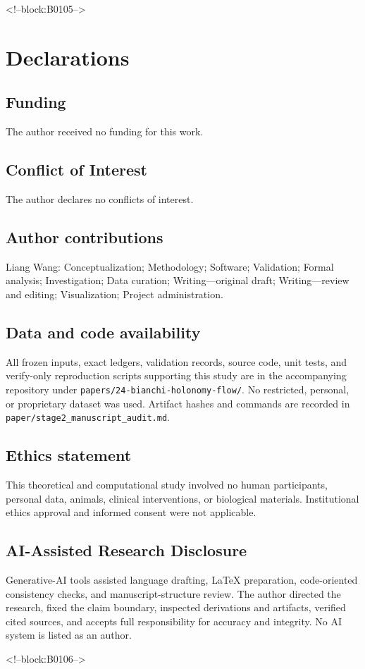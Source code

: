 \documentclass[11pt,a4paper]{article}
\theoremstyle{definition}
\theoremstyle{remark}
\begin{document}
<!--block:B0105-->
\section*{Declarations}
\subsection*{Funding}
The author received no funding for this work.
\subsection*{Conflict of Interest}
The author declares no conflicts of interest.
\subsection*{Author contributions}
Liang Wang: Conceptualization; Methodology; Software; Validation; Formal analysis; Investigation; Data curation; Writing---original draft; Writing---review and editing; Visualization; Project administration.
\subsection*{Data and code availability}
All frozen inputs, exact ledgers, validation records, source code, unit tests, and verify-only reproduction scripts supporting this study are in the accompanying repository under \texttt{papers/24-bianchi-holonomy-flow/}. No restricted, personal, or proprietary dataset was used. Artifact hashes and commands are recorded in \texttt{paper/stage2\_manuscript\_audit.md}.
\subsection*{Ethics statement}
This theoretical and computational study involved no human participants, personal data, animals, clinical interventions, or biological materials. Institutional ethics approval and informed consent were not applicable.
\subsection*{AI-Assisted Research Disclosure}
Generative-AI tools assisted language drafting, LaTeX preparation, code-oriented consistency checks, and manuscript-structure review. The author directed the research, fixed the claim boundary, inspected derivations and artifacts, verified cited sources, and accepts full responsibility for accuracy and integrity. No AI system is listed as an author.

<!--block:B0106-->


\end{document}
